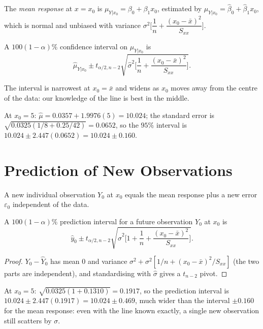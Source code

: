 The \emph{mean response} at $x=x_0$ is $\mu_{Y|x_0}=\beta_0+\beta_1x_0$, estimated by $\hat\mu_{Y|x_0}=\hat\beta_0+\hat\beta_1x_0$, which is normal and unbiased with variance $\sigma^2\Big[\dfrac1n+\dfrac{(x_0-\bar{x})^2}{S_{xx}}\Big]$.

\begin{theorem}\label{thm:meanresp}
A $100(1-\alpha)\%$ confidence interval on $\mu_{Y|x_0}$ is
\[ \hat\mu_{Y|x_0}\pm t_{\alpha/2,n-2}\sqrt{\hat\sigma^2\Big[\frac1n+\frac{(x_0-\bar{x})^2}{S_{xx}}\Big]}. \]
\end{theorem}

The interval is narrowest at $x_0=\bar{x}$ and widens as $x_0$ moves away from the centre of the data: our knowledge of the line is best in the middle.

\begin{example}
At $x_0=5$: $\hat\mu=0.0357+1.9976(5)=10.024$; the standard error is $\sqrt{0.0325(1/8+0.25/42)}=0.0652$, so the $95\%$ interval is $10.024\pm2.447(0.0652)=10.024\pm0.160$.
\end{example}

\section{Prediction of New Observations}

A new individual observation $Y_0$ at $x_0$ equals the mean response plus a new error $\varepsilon_0$ independent of the data.

\begin{theorem}\label{thm:regpi}
A $100(1-\alpha)\%$ prediction interval for a future observation $Y_0$ at $x_0$ is
\[ \hat{y}_0\pm t_{\alpha/2,n-2}\sqrt{\hat\sigma^2\Big[1+\frac1n+\frac{(x_0-\bar{x})^2}{S_{xx}}\Big]}. \]
\end{theorem}

\begin{proof}
$Y_0-\hat{Y}_0$ has mean $0$ and variance $\sigma^2+\sigma^2[1/n+(x_0-\bar{x})^2/S_{xx}]$ (the two parts are independent), and standardising with $\hat\sigma$ gives a $t_{n-2}$ pivot.
\end{proof}

\begin{example}
At $x_0=5$: $\sqrt{0.0325(1+0.1310)}=0.1917$, so the prediction interval is $10.024\pm2.447(0.1917)=10.024\pm0.469$, much wider than the interval $\pm0.160$ for the mean response: even with the line known exactly, a single new observation still scatters by $\sigma$.
\end{example}


